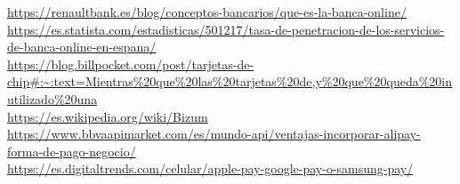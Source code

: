 

\url{https://renaultbank.es/blog/conceptos-bancarios/que-es-la-banca-online/}
\\
\url{https://es.statista.com/estadisticas/501217/tasa-de-penetracion-de-los-servicios-de-banca-online-en-espana/}
\\
\url{https://blog.billpocket.com/post/tarjetas-de-chip#:~:text=Mientras%20que%20las%20tarjetas%20de,y%20que%20queda%20inutilizado%20una}
\\
\url{https://es.wikipedia.org/wiki/Bizum}
\\
\url{https://www.bbvaapimarket.com/es/mundo-api/ventajas-incorporar-alipay-forma-de-pago-negocio/}
\\
\url{https://es.digitaltrends.com/celular/apple-pay-google-pay-o-samsung-pay/}